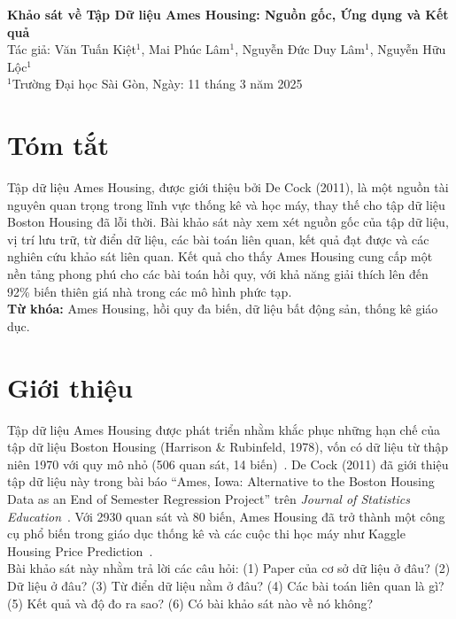 \documentclass{article}
\begin{document}
\begin{center}
    \textbf{\Large Khảo sát về Tập Dữ liệu Ames Housing: Nguồn gốc, Ứng dụng và Kết quả} \\
    \vspace{0.5cm}
    \normalsize Tác giả: Văn Tuấn Kiệt$^1$, Mai Phúc Lâm$^1$, Nguyễn Đức Duy Lâm$^1$, Nguyễn Hữu Lộc$^1$ \\
    \vspace{0.2cm}
    $^1$Trường Đại học Sài Gòn,
    \vspace{0.2cm}
    Ngày: 11 tháng 3 năm 2025 \\
    \vspace{0.2cm}
\end{center}

\section*{Tóm tắt}
Tập dữ liệu Ames Housing, được giới thiệu bởi De Cock (2011), là một nguồn tài nguyên quan trọng trong lĩnh vực thống kê và học máy, thay thế cho tập dữ liệu Boston Housing đã lỗi thời. Bài khảo sát này xem xét nguồn gốc của tập dữ liệu, vị trí lưu trữ, từ điển dữ liệu, các bài toán liên quan, kết quả đạt được và các nghiên cứu khảo sát liên quan. Kết quả cho thấy Ames Housing cung cấp một nền tảng phong phú cho các bài toán hồi quy, với khả năng giải thích lên đến 92\% biến thiên giá nhà trong các mô hình phức tạp. \\
\textbf{Từ khóa:} Ames Housing, hồi quy đa biến, dữ liệu bất động sản, thống kê giáo dục.

\section{Giới thiệu}
Tập dữ liệu Ames Housing được phát triển nhằm khắc phục những hạn chế của tập dữ liệu Boston Housing (Harrison \& Rubinfeld, 1978), vốn có dữ liệu từ thập niên 1970 với quy mô nhỏ (506 quan sát, 14 biến)~\cite{harrison1978}. De Cock (2011) đã giới thiệu tập dữ liệu này trong bài báo “Ames, Iowa: Alternative to the Boston Housing Data as an End of Semester Regression Project” trên \textit{Journal of Statistics Education}~\cite{decock2011}. Với 2930 quan sát và 80 biến, Ames Housing đã trở thành một công cụ phổ biến trong giáo dục thống kê và các cuộc thi học máy như Kaggle Housing Price Prediction~\cite{kaggle2016}. \\
Bài khảo sát này nhằm trả lời các câu hỏi: (1) Paper của cơ sở dữ liệu ở đâu? (2) Dữ liệu ở đâu? (3) Từ điển dữ liệu nằm ở đâu? (4) Các bài toán liên quan là gì? (5) Kết quả và độ đo ra sao? (6) Có bài khảo sát nào về nó không?
\end{document}
